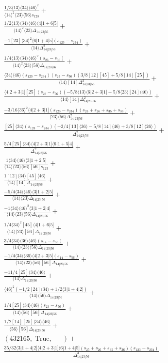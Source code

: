 \documentclass[varwidth, border=5pt]{standalone}
\begin{document}
\begin{my}
$\begin{gathered}
\scriptscriptstyle\frac{1/3⟨13⟩⟨34⟩⟨46⟩^2}{⟨14⟩^2⟨23⟩⟨56⟩s_{123}}+\\
\scriptscriptstyle\frac{1/2⟨13⟩⟨34⟩⟨46⟩⟨4|1+6|5]}{⟨14⟩^2⟨23⟩Δ_{14|23|56}}+\\
\scriptscriptstyle\frac{-1[23]⟨34⟩^2⟨6|1+4|5](s_{123}-s_{234})}{⟨14⟩Δ_{14|23|56}^2}+\\
\scriptscriptstyle\frac{1/4⟨13⟩⟨34⟩⟨46⟩^2(s_{23}-s_{56})}{⟨14⟩^2⟨23⟩⟨56⟩Δ_{14|23|56}}+\\
\scriptscriptstyle\frac{⟨34⟩⟨46⟩(s_{123}-s_{234})(s_{23}-s_{56})(3/8[12][45]+5/8[14][25])}{⟨14⟩[14]Δ_{14|23|56}^2}+\\
\scriptscriptstyle\frac{⟨4|2+3|1][25](s_{23}-s_{56})(-5/8⟨13⟩⟨6|2+3|1]-5/8⟨23⟩[24]⟨46⟩)}{⟨14⟩[14]Δ_{14|23|56}^2}+\\
\scriptscriptstyle\frac{-3/16⟨36⟩^2⟨4|2+3|1](s_{123}-s_{234})(s_{25}+s_{26}+s_{35}+s_{36})}{⟨23⟩⟨56⟩Δ_{14|23|56}^2}+\\
\scriptscriptstyle\frac{[25]⟨34⟩(s_{123}-s_{234})(-3/4[13]⟨36⟩-5/8[14]⟨46⟩+3/8[12]⟨26⟩)}{Δ_{14|23|56}^2}+\\
\scriptscriptstyle\frac{5/4[25]⟨34⟩⟨4|2+3|1]⟨6|1+5|4]}{Δ_{14|23|56}^2}+\\
\scriptscriptstyle\frac{1⟨34⟩⟨46⟩⟨3|1+2|5]}{⟨14⟩⟨23⟩⟨56⟩[56]s_{123}}+\\
\scriptscriptstyle\frac{1[12]⟨34⟩[45]⟨46⟩}{⟨14⟩[14]Δ_{14|23|56}}+\\
\scriptscriptstyle\frac{-5/4⟨34⟩⟨46⟩⟨3|1+2|5]}{⟨14⟩⟨23⟩Δ_{14|23|56}}+\\
\scriptscriptstyle\frac{-1⟨34⟩⟨46⟩^2⟨3|1+2|4]}{⟨14⟩⟨23⟩⟨56⟩Δ_{14|23|56}}+\\
\scriptscriptstyle\frac{1/4⟨34⟩^2[45]⟨4|1+6|5]}{⟨14⟩⟨23⟩[56]Δ_{14|23|56}}+\\
\scriptscriptstyle\frac{3/4⟨34⟩⟨36⟩⟨46⟩(s_{14}-s_{56})}{⟨14⟩⟨23⟩⟨56⟩Δ_{14|23|56}}+\\
\scriptscriptstyle\frac{-1/4⟨34⟩⟨36⟩⟨4|2+3|5](s_{14}-s_{56})}{⟨14⟩⟨23⟩⟨56⟩[56]Δ_{14|23|56}}+\\
\scriptscriptstyle\frac{-11/4[25]⟨34⟩⟨46⟩}{⟨14⟩Δ_{14|23|56}}+\\
\scriptscriptstyle\frac{⟨46⟩^2(-1/2[24]⟨34⟩+1/2⟨3|1+4|2])}{⟨14⟩⟨56⟩Δ_{14|23|56}}+\\
\scriptscriptstyle\frac{1/4[25]⟨34⟩⟨46⟩(s_{23}-s_{56})}{⟨14⟩⟨56⟩[56]Δ_{14|23|56}}+\\
\scriptscriptstyle\frac{1/2[14][25]⟨34⟩⟨46⟩}{⟨56⟩[56]Δ_{14|23|56}}+\\
\scriptscriptstyle(432165,\;\text{True},\;-)+\\
\scriptscriptstyle\frac{35/32⟨3|1+4|2]⟨4|2+3|1]⟨6|1+4|5](s_{25}+s_{26}+s_{35}+s_{36})(s_{123}-s_{234})}{Δ_{14|23|56}^3}\phantom{+}
\end{gathered}$
\end{my}
\end{document}
